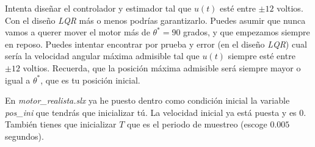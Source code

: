 \documentclass[11pt,a4paper,titlepage]{article}
\begin{document}
	Intenta diseñar el controlador y estimador tal que $u(t)$ esté entre $\pm 12$ voltios. Con el diseño \emph{LQR} más o menos podrías garantizarlo. Puedes asumir que nunca vamos a querer mover el motor más de $\theta^* = 90$ grados, y que empezamos siempre en reposo. Puedes intentar encontrar por prueba y error (en el diseño \emph{LQR}) cual sería la velocidad angular máxima admisible tal que $u(t)$ siempre esté entre $\pm 12$ voltios. Recuerda, que la posición máxima admisible será siempre mayor o igual a $\theta^*$, que es tu posición inicial.

En \emph{motor\_realista.slx} ya he puesto dentro como condición inicial la variable \emph{pos\_ini} que tendrás que inicializar tú. La velocidad inicial ya está puesta y es $0$. También tienes que inicializar $T$ que es el periodo de muestreo (escoge $0.005$ segundos).
\end{document}

